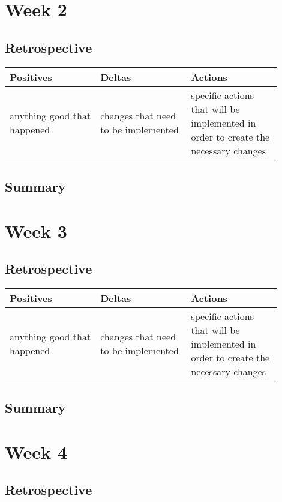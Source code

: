 \documentclass[letterpaper,10pt,serif,draftclsnofoot,onecolumn,compsoc,titlepage]{IEEEtran}
\begin{document}
\section{Week 2}
\subsection{Retrospective}

\begin{tabular}{|p{0.3\linewidth}|p{0.3\linewidth}|p{0.3\linewidth}|}
   \hline
   \textbf{Positives} & \textbf{Deltas} & \textbf{Actions}\\ 
   \hline
   anything good that happened & changes that need to be implemented & specific actions that will be implemented in order to create the necessary changes \\
   \hline
\end{tabular}

\subsection{Summary}

\section{Week 3}
\subsection{Retrospective}

\begin{tabular}{|p{0.3\linewidth}|p{0.3\linewidth}|p{0.3\linewidth}|}
   \hline
   \textbf{Positives} & \textbf{Deltas} & \textbf{Actions}\\ 
   \hline
   anything good that happened & changes that need to be implemented & specific actions that will be implemented in order to create the necessary changes \\
   \hline
\end{tabular}

\subsection{Summary}

\section{Week 4}
\subsection{Retrospective}
\end{document}
